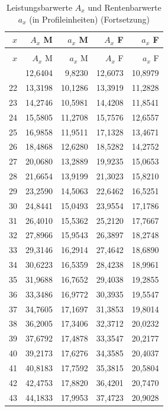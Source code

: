 \begin{small}
\begin{longtable}{rrrrr}
\caption{Leistungsbarwerte $A_x$ und Rentenbarwerte $a_x$ (in Profileinheiten)}\label{tab:barwerte}\\
\toprule
$x$ & $A_x$ M & $a_x$ M & $A_x$ F & $a_x$ F \\
\midrule
\endfirsthead
\caption[]{Leistungsbarwerte $A_x$ und Rentenbarwerte $a_x$ (in Profileinheiten) (Fortsetzung)}\\
\toprule
$x$ & $A_x$ M & $a_x$ M & $A_x$ F & $a_x$ F \\
\midrule
\endhead
\bottomrule
\endfoot
21 & 12,6404 & 9,8230 & 12,6073 & 10,8979 \\
22 & 13,3198 & 10,1286 & 13,3919 & 11,2828 \\
23 & 14,2746 & 10,5981 & 14,4208 & 11,8541 \\
24 & 15,5805 & 11,2708 & 15,7576 & 12,6557 \\
25 & 16,9858 & 11,9511 & 17,1328 & 13,4671 \\
26 & 18,4868 & 12,6280 & 18,5282 & 14,2752 \\
27 & 20,0680 & 13,2889 & 19,9235 & 15,0653 \\
28 & 21,6654 & 13,9199 & 21,3023 & 15,8210 \\
29 & 23,2590 & 14,5063 & 22,6462 & 16,5251 \\
30 & 24,8441 & 15,0493 & 23,9554 & 17,1786 \\
31 & 26,4010 & 15,5362 & 25,2120 & 17,7667 \\
32 & 27,8966 & 15,9543 & 26,3897 & 18,2748 \\
33 & 29,3146 & 16,2914 & 27,4642 & 18,6890 \\
34 & 30,6223 & 16,5359 & 28,4238 & 18,9961 \\
35 & 31,9688 & 16,7652 & 29,4038 & 19,2855 \\
36 & 33,3486 & 16,9772 & 30,3935 & 19,5547 \\
37 & 34,7605 & 17,1697 & 31,3853 & 19,8014 \\
38 & 36,2005 & 17,3406 & 32,3712 & 20,0232 \\
39 & 37,6792 & 17,4878 & 33,3547 & 20,2177 \\
40 & 39,2173 & 17,6276 & 34,3585 & 20,4037 \\
41 & 40,8183 & 17,7592 & 35,3815 & 20,5804 \\
42 & 42,4753 & 17,8820 & 36,4201 & 20,7470 \\
43 & 44,1833 & 17,9953 & 37,4723 & 20,9028 \\

\end{longtable}
\end{small}
